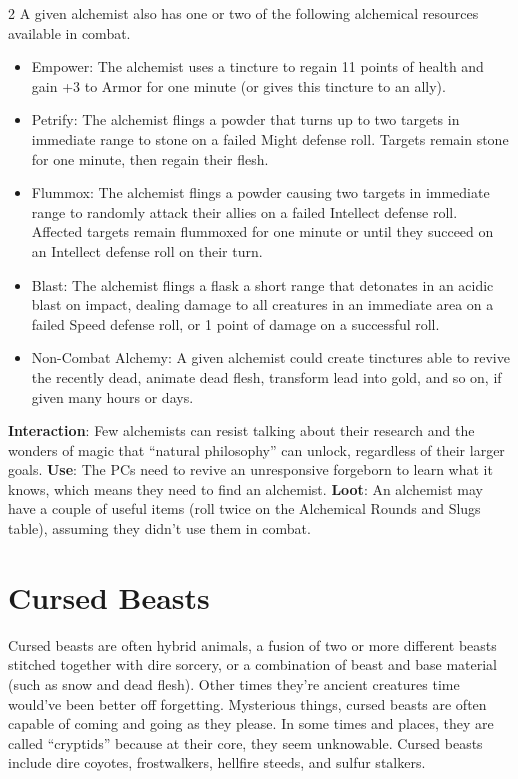 \begin{multicols}{2}
A given alchemist also has one or two of the following alchemical resources available in combat.
\begin{itemize}
\item	Empower: The alchemist uses a tincture to regain 11 points of health and gain +3 to Armor for one minute (or gives this tincture to an ally). 
\item	Petrify: The alchemist flings a powder that turns up to two targets in immediate range to stone on a failed Might defense roll. Targets remain stone for one minute, then regain their flesh.
\item	Flummox: The alchemist flings a powder causing two targets in immediate range to randomly attack their allies on a failed Intellect defense roll. Affected targets remain flummoxed for one minute or until they succeed on an Intellect defense roll on their turn. 
\item	Blast: The alchemist flings a flask a short range that detonates in an acidic blast on impact, dealing damage to all creatures in an immediate area on a failed Speed defense roll, or 1 point of damage on a successful roll.
\item	Non-Combat Alchemy: A given alchemist could create tinctures able to revive the recently dead, animate dead flesh, transform lead into gold, and so on, if given many hours or days.
\end{itemize}
\textbf{Interaction}: Few alchemists can resist talking about their research and the wonders of magic that “natural philosophy” can unlock, regardless of their larger goals.
\textbf{Use}: The PCs need to revive an unresponsive forgeborn to learn what it knows, which means they need to find an alchemist.
\textbf{Loot}: An alchemist may have a couple of useful items (roll twice on the Alchemical Rounds and Slugs table), assuming they didn’t use them in combat.

\section{Cursed Beasts}
Cursed beasts are often hybrid animals, a fusion of two or more different beasts stitched together with dire sorcery, or a combination of beast and base material (such as snow and dead flesh). Other times they’re ancient creatures time would’ve been better off forgetting. 
Mysterious things, cursed beasts are often capable of coming and going as they please. In some times and places, they are called “cryptids” because at their core, they seem unknowable. Cursed beasts include dire coyotes, frostwalkers, hellfire steeds, and sulfur stalkers.


\end{multicols}
